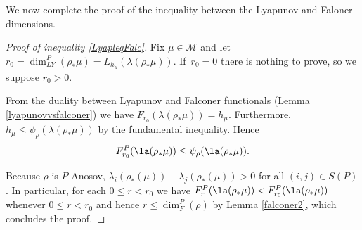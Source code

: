 We now complete the proof of the inequality between the Lyapunov and Faloner dimensions.

\begin{proof}[Proof of inequality \eqref{LyapleqFalc}]
Fix \(\mu \!\in\! \mathcal{M}\) and let \(r_0 \!=\! \dim_{LY}^P(\rho_\ast \mu) \!=\! L_{h_\mu}(\lambda(\rho_*\mu))\). If~\hbox{\(r_0 = 0\)} there is nothing to prove, so we suppose \(r_0 > 0\).

From the duality between Lyapunov and Falconer functionals (Lemma \ref{lyapunovvsfalconer}) we have
\(F_{r_0}(\lambda(\rho_*\mu)) = h_\mu\). Furthermore, \(h_\mu \le \psi_{\rho}(\lambda(\rho_{*}\mu)) \) by the fundamental inequality. Hence
\[
F_{r_0}^P(\la(\rho_*\mu)) \le \psi_\rho (\la(\rho_*\mu)).
\]

Because \(\rho\) is \(P\)-Anosov, \(\lambda_i(\rho_*(\mu)) - \lambda_j(\rho_*(\mu)) > 0\) for all \((i,j) \in S(P)\). In particular, for each \(0\le r < r_0\) we have \(F_{r}^P(\la(\rho_*\mu)) < F_{r_0}^P(\la(\rho_*\mu))\) whenever \(0 \le r < r_0\) and hence
\(r \le \dim_F^P(\rho) \) by Lemma \ref{falconer2}, which concludes the proof.
\end{proof}

